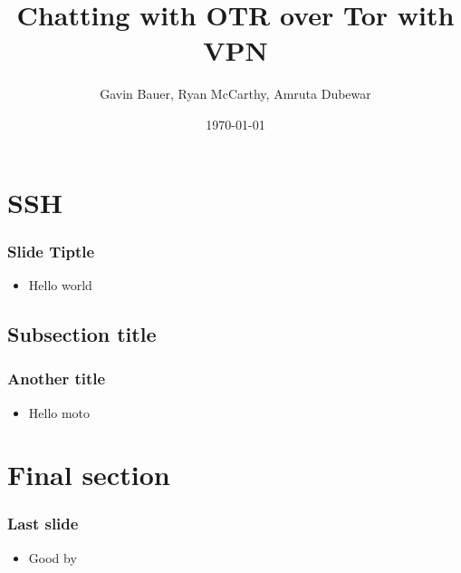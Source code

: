\documentclass{beamer}
\title{Chatting with OTR over Tor with VPN}
\author{Gavin Bauer, Ryan McCarthy, Amruta Dubewar}
\date{\today}
\begin{document}
\begin{frame}
\maketitle
\end{frame}
\section{SSH}
\begin{frame}
\frametitle{Slide Tiptle}
\begin{itemize}
\item Hello world
\end{itemize}
\end{frame}
\subsection{Subsection title}
\begin{frame}
\frametitle{Another title}
\begin{itemize}
\item Hello moto
\end{itemize}
\end{frame}
\section{Final section}
\begin{frame}
\frametitle{Last slide}
\begin{itemize}
\item Good by
\end{itemize}
\end{frame}
\end{document}
